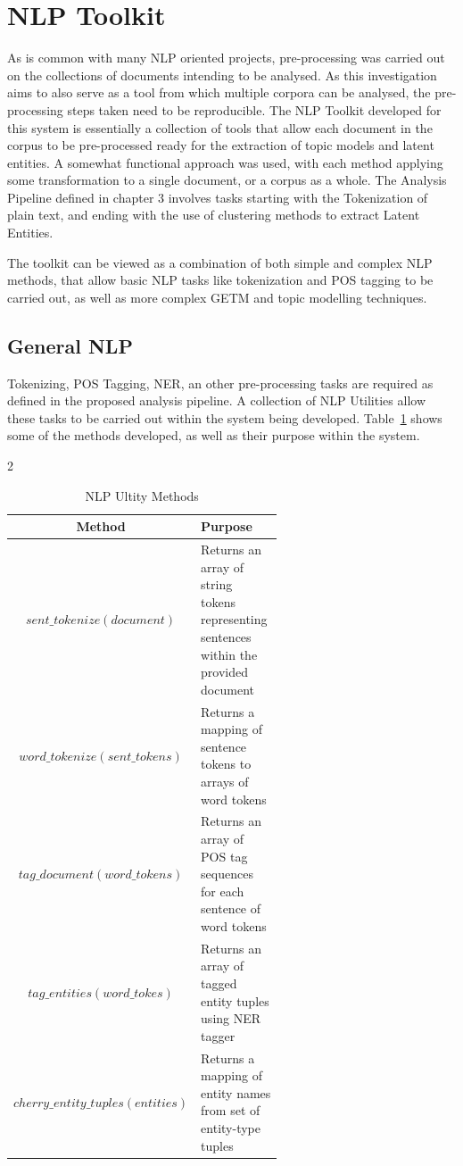 \documentclass[10pt]{report}
\begin{document}
\section{NLP Toolkit}
As is common with many NLP oriented projects, pre-processing was carried out on the collections of documents intending to be analysed. As this investigation aims to also serve as a tool from which multiple corpora can be analysed, the pre-processing steps taken need to be reproducible. The NLP Toolkit developed for this system is essentially a collection of tools that allow each document in the corpus to be pre-processed ready for the extraction of topic models and latent entities. A somewhat functional approach was used, with each method applying some transformation to a single document, or a corpus as a whole. The Analysis Pipeline defined in chapter 3 involves tasks starting with the Tokenization of plain text, and ending with the use of clustering methods to extract Latent Entities.

The toolkit can be viewed as a combination of both simple and complex NLP methods, that allow basic NLP tasks like tokenization and POS tagging to be carried out, as well as more complex GETM and topic modelling techniques.

\subsection{General NLP}
Tokenizing, POS Tagging, NER, an other pre-processing tasks are required as defined in the proposed analysis pipeline. A collection of NLP Utilities allow these tasks to be carried out within the system being developed. Table~\ref{tab:nlp_utilities} shows some of the methods developed, as well as their purpose within the system. 

\renewcommand{\arraystretch}{2.0}
\renewcommand{\baselinestretch}{1.0}\normalsize
\begin{table}[h!]
2  \begin{tabular}{c | p{0.6\linewidth} }
    Method & Purpose\\
    \hline
    $sent\_tokenize(document)$ & Returns an array of string tokens representing sentences within the provided document  \\
    $word\_tokenize(sent\_tokens)$& Returns a mapping of sentence tokens to arrays of word tokens \\
    $tag\_document(word\_tokens)$ & Returns an array of POS tag sequences for each sentence of word tokens\\
    $tag\_entities(word\_tokes)$ & Returns an array of tagged entity tuples using NER tagger\\
    $cherry\_entity\_tuples(entities)$ & Returns a mapping of entity names from set of entity-type tuples\\
  \end{tabular}
  \caption{NLP Ultity Methods\label{tab:nlp_utilities}}
\end{table}
\renewcommand{\baselinestretch}{2.0}\normalsize
\renewcommand{\arraystretch}{1.0}
\end{document}
